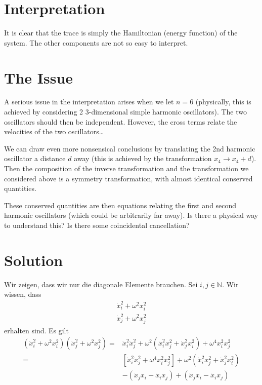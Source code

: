 \documentclass[prb,12pt]{revtex4-2}
\theoremstyle{definition}
\theoremstyle{definition}
\newcommand{\N}{\mathbb{N}}
\begin{document}
\section{Interpretation}
It is clear that the trace is simply the Hamiltonian (energy function) of the system. The other components are not so easy to interpret. 

\section{The Issue}
A serious issue in the interpretation arises when we let $n=6$ (physically, this is achieved by considering 2 3-dimensional simple harmonic oscillators). The two oscillators should then be independent. However, the cross terms relate the velocities of the two oscillators\ldots

We can draw even more nonsensical conclusions by translating the 2nd harmonic oscillator a distance $d$ away (this is achieved by the transformation $x_4\to x_4+d$). Then the composition of the inverse transformation and the transformation we considered above is a symmetry transformation, with almost identical conserved quantities. 

These conserved quantities are then equations relating the first and second harmonic oscillators (which could be arbitrarily far away). Is there a physical way to understand this? Is there some coincidental cancellation?
\newpage
\section{Solution}
Wir zeigen, dass wir nur die diagonale Elemente brauchen. Sei  $i,j\in \N$. Wir wissen, dass 
\begin{gather*}
	\dot{x}_i^2+\omega^2 x_i^2\\
	\dot{x}_j^2+\omega^2 x_j^2
\end{gather*}
erhalten sind. Es gilt
\begin{align*}
	(\dot{x}_i^2+\omega^2 x_i^2)(\dot{x}_j^2+\omega^2 x_j^2)=&\dot{x}_i^2\dot{x}_j^2+\omega^2\left( \dot{x}_i^2x_j^2+\dot{x}_j^2x_i^2 \right) +\omega^4x_i^2x_j^2\\
	=&\left[ \dot{x}_i^2\dot{x}_j^2+\omega^4 x_i^2x_j^2 \right] +\omega^2\left( \dot{x}_i^2 x_j^2+\dot{x}_j^2x_i^2 \right)\\
	 &-(\dot{x}_jx_i-\dot{x}_ix_j)+(\dot{x}_jx_i-\dot{x}_ix_j)
\end{align*}
\end{document}
